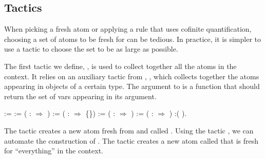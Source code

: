 \documentclass[12pt]{report}
\begin{document}
\subsection{Tactics}



 When picking a fresh atom or applying a rule that uses cofinite
    quantification, choosing a set of atoms to be fresh for can be
    tedious.  In practice, it is simpler to use a tactic to choose the
    set to be as large as possible.


    The first tactic we define, , is used to collect
    together all the atoms in the context.  It relies on an auxiliary
    tactic from , , which collects
    together the atoms appearing in objects of a certain type.  The argument 
    to  is a function that should return the set of
    vars appearing in its argument. 

\begin{coqdoccode}
\coqdocemptyline
\coqdocnoindent
{}  :=\coqdoceol
\coqdocindent{1.00em}
  :=  (  :  \ensuremath{\Rightarrow} ) \coqdoceol
\coqdocindent{1.00em}
  :=  (  :  \ensuremath{\Rightarrow} \{\}) \coqdoceol
\coqdocindent{1.00em}
  :=  (  :  \ensuremath{\Rightarrow}  ) \coqdoceol
\coqdocindent{1.00em}
  :=  (  :  \ensuremath{\Rightarrow}  ) \coqdoceol
\coqdocindent{1.00em}
:(      ).\coqdoceol
\coqdocemptyline
\end{coqdoccode}
The tactic    creates a new atom fresh 
    from  and called . Using the tactic ,
    we can automate the construction of . The tactic
      creates a new atom called  that is fresh
    for ``everything'' in the context.
\end{document}

